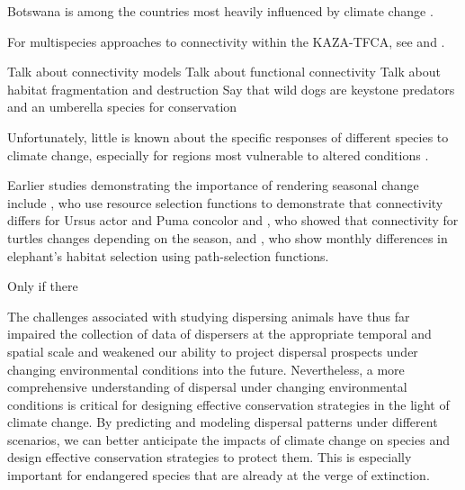 \documentclass[abstract=on,10pt,a4paper,bibliography=totocnumbered]{article}
\begin{document}
Botswana is among the countries most heavily influenced by climate change .

For multispecies approaches to connectivity within the KAZA-TFCA, see
\cite{Brennan.2020} and \cite{Lines.2021}.




Talk about connectivity models
Talk about functional connectivity
Talk about habitat fragmentation and destruction
Say that wild dogs are keystone predators and an umberella species for
conservation

Unfortunately, little is known about the specific responses of different species
to climate change, especially for regions most vulnerable to altered conditions
\citep{Paniw.2021}.

Earlier studies demonstrating the importance of rendering seasonal change
include \cite{Chetkiewicz.2009}, who use resource selection functions to demonstrate
that connectivity differs for Ursus actor and Puma concolor and \cite{Mui.2017},
who showed that connectivity for turtles changes depending on the season, and
\cite{Kaszta.2021}, who show monthly differences in elephant's habitat selection
using path-selection functions.



Only if there

The challenges associated with studying dispersing animals have thus far
impaired the collection of data of dispersers at the appropriate temporal and
spatial scale \citep{Graves.2014, Vasudev.2015} and weakened our ability to
project dispersal prospects under changing environmental conditions into the
future. Nevertheless, a more comprehensive understanding of dispersal under
changing environmental conditions is critical for designing effective
conservation strategies in the light of climate change. By predicting and
modeling dispersal patterns under different scenarios, we can better anticipate
the impacts of climate change on species and design effective conservation
strategies to protect them. This is especially important for endangered species
that are already at the verge of extinction.
\end{document}
